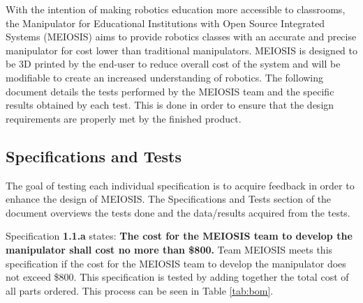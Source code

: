% 
% 
% 

With the intention of making robotics education more accessible to classrooms, the Manipulator for Educational Institutions with Open Source Integrated Systems (MEIOSIS) aims to provide robotics classes with an accurate and precise manipulator for cost lower than traditional manipulators. MEIOSIS is designed to be 3D printed by the end-user to reduce overall cost of the system and will be modifiable to create an increased understanding of robotics. The following document details the tests performed by the MEIOSIS team and the specific results obtained by each test. This is done in order to ensure that the design requirements are properly met by the finished product.


\subsection{Specifications and Tests}\label{sec:tests}
The goal of testing each individual specification is to acquire feedback in order to enhance the design of MEIOSIS. The Specifications and Tests section of the document overviews the tests done and the data/results acquired from the tests.

Specification \textbf{1.1.a} states: \textbf{The cost for the MEIOSIS team to develop the manipulator shall cost no more than \$800.} Team MEIOSIS meets this specification if the cost for the MEIOSIS team to develop the manipulator does not exceed \$800. This specification is tested by adding together the total cost of all parts ordered. This process can be seen in Table \ref{tab:bom}.

